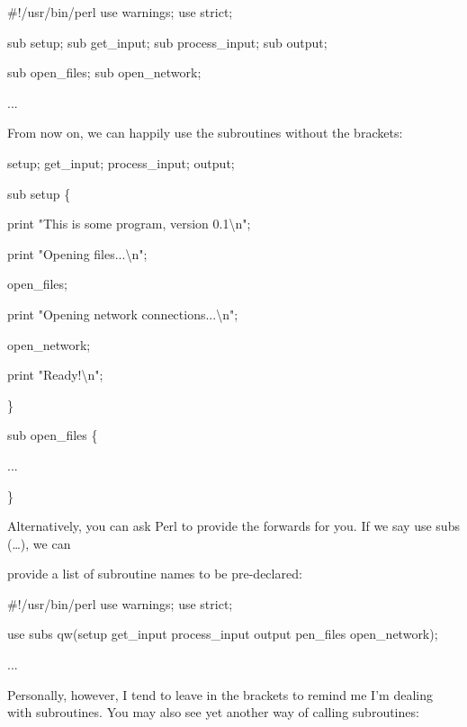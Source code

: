 \documentclass[a4paper,11pt]{book}
\begin{document}
\noindent 

\noindent \#!/usr/bin/perl use warnings; use strict;

\noindent sub setup; sub get\_input; sub process\_input; sub output;

\noindent sub open\_files; sub open\_network;

\noindent ...

\noindent 

\noindent From now on, we can happily use the subroutines without the brackets:

\noindent 

\noindent setup; get\_input; process\_input; output;

\noindent 

\noindent sub setup \{

\noindent print "This is some program, version 0.1\textbackslash n";

\noindent print "Opening files...\textbackslash n";

\noindent open\_files;

\noindent print "Opening network connections...\textbackslash n";

\noindent open\_network;

\noindent print "Ready!\textbackslash n";

\noindent \}

\noindent 

\noindent sub open\_files \{

\noindent ...

\noindent \}

\noindent 

\noindent 

\noindent Alternatively, you can ask Perl to provide the forwards for you. If we say use subs (\dots ), we can

\noindent provide a list of subroutine names to be pre-declared:

\noindent 

\noindent \#!/usr/bin/perl use warnings; use strict;

\noindent use subs qw(setup get\_input process\_input output pen\_files open\_network);

\noindent ...

\noindent 

\noindent Personally, however, I tend to leave in the brackets to remind me I'm dealing with subroutines. You may also see yet another way of calling subroutines:

\noindent 
\end{document}
